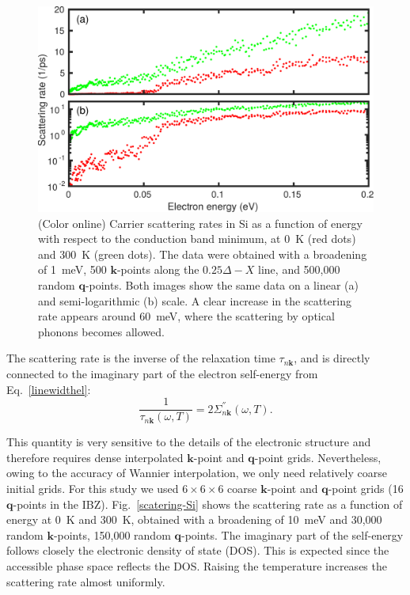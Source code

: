 \documentclass[final,3p,times,twocolumn]{elsarticle}
\begin{document}
\begin{figure}[t!]
  \centering
  \includegraphics[width=0.99\linewidth]{Si_scattering_zoom3.pdf}
  \caption{\label{scatering-Si2} (Color online) Carrier scattering rates in Si as a function of energy with respect to the conduction band minimum, at 0~K (red dots) and 300~K (green dots). The data were obtained with a broadening of 1~meV, 500 $\mathbf{k}$-points along the $0.25\Delta-X$ line, and 500,000 random $\mathbf{q}$-points. Both images show the same data on a linear (a) and semi-logarithmic (b) scale. A clear increase in the scattering rate appears around 60~meV, where the scattering by optical phonons becomes allowed.  }
\end{figure}


The scattering rate is the inverse of the relaxation time $\tau_{n\mathbf{k}}$, and is directly connected to the imaginary part of the electron self-energy from Eq.~\eqref{linewidthel}:
\begin{equation}\label{scatteringRate}
\frac{1}{\tau_{n\mathbf{k}}(\omega,T)} = 2 \Sigma_{n\mathbf{k}}^{''}(\omega,T).
\end{equation}  



This quantity is very sensitive to the details of the electronic structure and therefore requires dense interpolated $\mathbf{k}$-point and $\mathbf{q}$-point grids. Nevertheless, owing to the accuracy of Wannier interpolation, we only need relatively coarse initial grids. For this study we used $6\times6\times6$ coarse $\mathbf{k}$-point and $\mathbf{q}$-point grids (16 $\mathbf{q}$-points in the IBZ). 
Fig.~\ref{scatering-Si} shows the scattering rate as a function of energy at 0~K and 300~K, obtained with a broadening of 10~meV and 30,000 random $\mathbf{k}$-points, 150,000 random $\mathbf{q}$-points. The imaginary part of the self-energy follows closely the electronic density of state (DOS). This is expected since the accessible phase space reflects the DOS. Raising the temperature increases the scattering rate almost uniformly.
\end{document}
